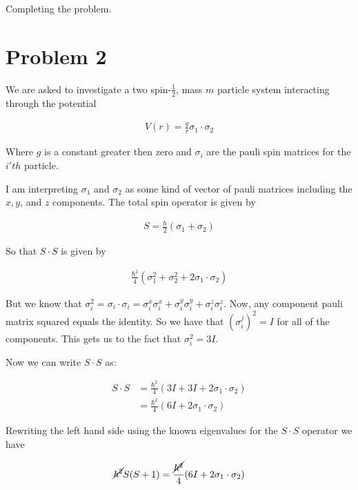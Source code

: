 \documentclass[paper=a4, fontsize=11pt]{scrartcl} %
\numberwithin{equation}{section} %
\numberwithin{figure}{section} %
\numberwithin{table}{section} %
\begin{document}
Completing the problem.

\section{Problem 2}

We are asked to investigate a two spin-$\frac{1}{2}$, mass $m$ particle system interacting through the potential 

\begin{align}
V(r) = \frac{g}{r}\sigma_1 \cdot \sigma_2
\end{align}

Where $g$ is a constant greater then zero and $\sigma_i$ are the pauli spin matrices for the $i'th$ particle.

I am interpreting $\sigma_1$ and $\sigma_2$ as some kind of vector of pauli matrices including the $x,y$, and $z$ components. The total spin operator is given by 

\begin{align}
S = \frac{\hbar}{2}(\sigma_1 + \sigma_2)
\end{align}

So that $S \cdot S$ is given by

\begin{align}
\frac{\hbar^2}{4}(\sigma_1^2 + \sigma_2^2 + 2 \sigma_1 \cdot \sigma_2)
\end{align}

But we know that $\sigma_i^2 = \sigma_i \cdot \sigma_i = \sigma_i^x \sigma_i^x + \sigma_i^y \sigma_i^y + \sigma_i^z \sigma_i^z$. Now, any component pauli matrix squared equals the identity. So we have that $(\sigma_i^j)^2 = I$ for all of the components. This gets us to the fact that $\sigma_i^2 = 3I$.

\hspace{2mm}

Now we can write $S \cdot S$ as:

\begin{align}
S \cdot S &= \frac{\hbar^2}{4}(3I +3I + 2 \sigma_1 \cdot \sigma_2) \\
&= \frac{\hbar^2}{4}(6I + 2\sigma_1\cdot\sigma_2)
\end{align} 

Rewriting the left hand side using the known eigenvalues for the $S \cdot S$ operator we have 

\begin{align}
\cancel{\hbar^2} S(S+1) = \frac{\cancel{\hbar^2}}{4}(6I + 2 \sigma_1 \cdot \sigma_2)
\end{align}
\end{document}
